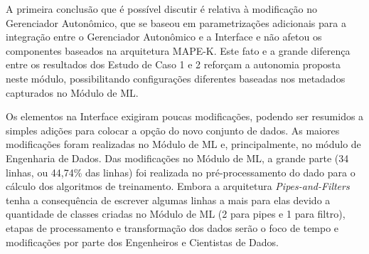 \documentclass[Portugues,Final]{ic-tese-v3}
\begin{document}
\begin{table}[H]
\begin{center}
  \caption{Quantidade de modificações realizadas ao adicionar um novo conjunto de dados ao Módulo de ML}
\label{tbl:ManutencaoPipelineDataset}
\end{center}
\end{table}

A primeira conclusão que é possível discutir é relativa à modificação no Gerenciador Autonômico, que se baseou em parametrizações adicionais para a integração entre o Gerenciador Autonômico e a Interface e não afetou os componentes baseados na arquitetura MAPE-K. Este fato e a grande diferença entre os resultados dos Estudo de Caso 1 e 2 reforçam a autonomia proposta neste módulo, possibilitando configurações diferentes baseadas nos metadados capturados no Módulo de ML.

Os elementos na Interface exigiram poucas modificações, podendo ser resumidos a simples adições para colocar a opção do novo conjunto de dados. As maiores modificações foram realizadas no Módulo de ML e, principalmente, no módulo de Engenharia de Dados. Das modificações no Módulo de ML, a grande parte (34 linhas, ou 44,74\% das linhas) foi realizada no pré-processamento do dado para o cálculo dos algoritmos de treinamento. Embora a arquitetura \textit{Pipes-and-Filters} tenha a consequência de escrever algumas linhas a mais para elas devido a quantidade de classes criadas no Módulo de ML (2 para pipes e 1 para filtro), etapas de processamento e transformação dos dados serão o foco de tempo e modificações por parte dos Engenheiros e Cientistas de Dados.
\end{document}
